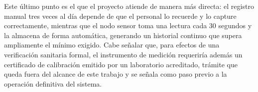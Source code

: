Este último punto es el que el proyecto atiende de manera más directa: el registro manual tres veces al día depende de que el personal lo recuerde y lo capture correctamente, mientras que el nodo sensor toma una lectura cada 30 segundos y la almacena de forma automática, generando un historial continuo que supera ampliamente el mínimo exigido. Cabe señalar que, para efectos de una verificación sanitaria formal, el instrumento de medición requeriría además un certificado de calibración emitido por un laboratorio acreditado, trámite que queda fuera del alcance de este trabajo y se señala como paso previo a la operación definitiva del sistema.
